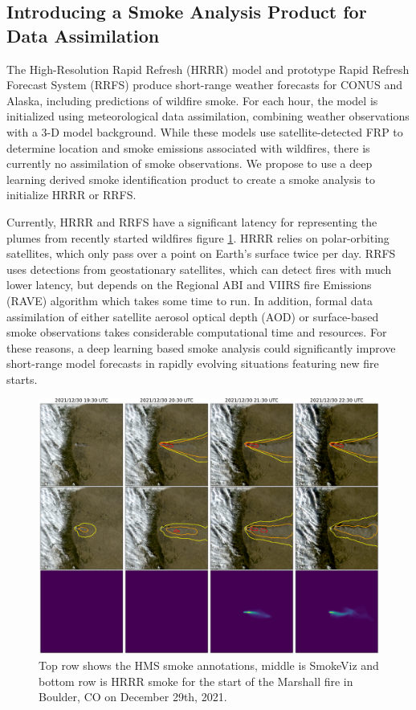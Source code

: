 \subsection{Introducing a Smoke Analysis Product for Data Assimilation}

The High-Resolution Rapid Refresh (HRRR) model and prototype Rapid Refresh Forecast System (RRFS) produce short-range weather forecasts for CONUS and Alaska, including predictions of wildfire smoke. For each hour, the model is initialized using meteorological data assimilation, combining weather observations with a 3-D model background. While these models use satellite-detected FRP to determine location and smoke emissions associated with wildfires, there is currently no assimilation of smoke observations. We propose to use a deep learning derived smoke identification product to create a smoke analysis to initialize HRRR or RRFS.  

Currently, HRRR and RRFS have a significant latency for representing the plumes from recently started wildfires figure \ref{marshall}.  HRRR relies on polar-orbiting satellites, which only pass over a point on Earth’s surface twice per day.  RRFS uses detections from geostationary satellites, which can detect fires with much lower latency, but depends on the Regional ABI and VIIRS fire Emissions (RAVE) algorithm which takes some time to run.  In addition, formal data assimilation of either satellite aerosol optical depth (AOD) or surface-based smoke observations takes considerable computational time and resources.  For these reasons, a deep learning based smoke analysis could significantly improve short-range model forecasts in rapidly evolving situations featuring new fire starts.  

\begin{figure}
    \centering
    \includegraphics[width=\linewidth]{figures/marshall.png}
    \caption{Top row shows the HMS smoke annotations, middle is SmokeViz and bottom row is HRRR smoke for the start of the Marshall fire in Boulder, CO on December 29th, 2021.}\label{marshall}
\end{figure}

